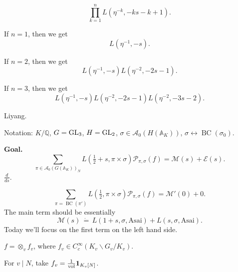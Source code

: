 \documentclass[reqno]{amsart} 
\begin{document}
\begin{equation*}
  \prod_{k = 1 }^n L(
  \eta^{-k},
  - k s - k + 1
  ).
\end{equation*}

\begin{example}\label{example:cnfg5j2iii}
  If $n = 1$, then we get
  \begin{equation*}
    L(\eta^{-1}, - s).
  \end{equation*}
\end{example}
\begin{example}\label{example:cnfg5j2kbr}
  If $n =2$, then we get
  \begin{equation*}
    L(\eta^{-1}, - s) L(\eta^{-2}, - 2 s -1).
  \end{equation*}
\end{example}
\begin{example}\label{example:cnfg5j2k8u}
  If $n=3$, then we get
  \begin{equation*}
    L(\eta^{-1}, - s) L(\eta^{-2}, - 2 s -1) L(\eta^{-2}, - 3 s - 2).
  \end{equation*}
\end{example}

Liyang.

Notation: $K/\mathbb{Q}$, $G = \operatorname{GL}_3$, $H = \operatorname{GL}_2$, $\sigma \in \mathcal{A}_0(H(\mathbb{A}_K))$, $\sigma \leftrightarrow \operatorname{BC}(\sigma_0)$.

\textbf{Goal.}
\begin{equation*}
  \sum_{\pi \in \mathcal{A}_0(G(\mathbb{A}_K ))_N}
  L(\tfrac{1}{2} + s, \pi \times \sigma)
  \mathcal{P}_{\pi, \sigma }(f)
  = \mathcal{M}(s) + \mathcal{E}(s).
\end{equation*}
$\frac{d}{d s}$.

\begin{equation*}
  \sum_{\pi = \operatorname{BC}(\pi ')}
  L(\tfrac{1}{2}, \pi \times \sigma)
  \mathcal{P}_{\pi, \sigma}(f) = \mathcal{M} '(0) + 0.
\end{equation*}
The main term should be essentially
\begin{equation*}
  \mathcal{M}(s) \, \dot{=} \, L(1 + s, \sigma, \mathrm{Asai})
  + L(s, \sigma, \mathrm{Asai}).
\end{equation*}
Today we'll focus on the first term on the left hand side.

$f = \otimes_v f_v$, where $f_v \in C_c^\infty(K_v \backslash G_v / K_v)$.

For $v \mid N$, take $f_v = \frac{1}{\operatorname{vol}} \mathbf{1}_{K_v [N]}$.
\end{document}
